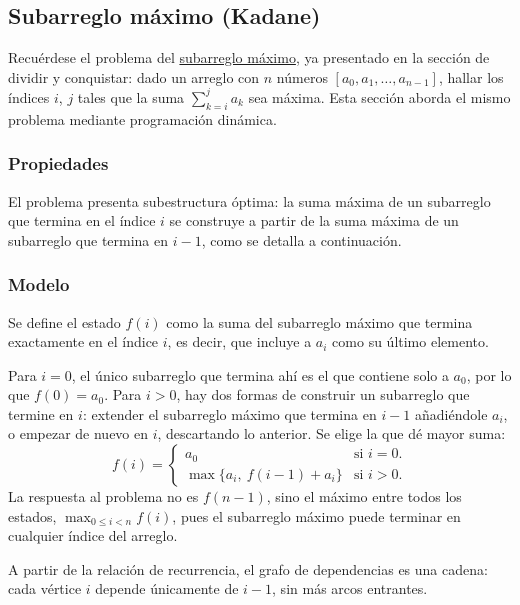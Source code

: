 \subsection{Subarreglo máximo (Kadane)}

Recuérdese el problema del \hyperref[sec:subarreglo_max]{subarreglo máximo}, ya presentado en la sección de dividir y conquistar: dado un arreglo con \(n\) números \([a_0, a_1, \ldots, a_{n-1}]\), hallar los índices \(i\), \(j\) tales que la suma \(\sum_{k=i}^j a_k\) sea máxima. Esta sección aborda el mismo problema mediante programación dinámica.

\subsubsection{Propiedades}

El problema presenta subestructura óptima: la suma máxima de un subarreglo que termina en el índice \(i\) se construye a partir de la suma máxima de un subarreglo que termina en \(i-1\), como se detalla a continuación.

\subsubsection{Modelo}

Se define el estado \(f(i)\) como la suma del subarreglo máximo que termina exactamente en el índice \(i\), es decir, que incluye a \(a_i\) como su último elemento.

Para \(i = 0\), el único subarreglo que termina ahí es el que contiene solo a \(a_0\), por lo que \(f(0) = a_0\). Para \(i > 0\), hay dos formas de construir un subarreglo que termine en \(i\): extender el subarreglo máximo que termina en \(i-1\) añadiéndole \(a_i\), o empezar de nuevo en \(i\), descartando lo anterior. Se elige la que dé mayor suma:
\[
f(i) = \begin{cases}
  a_0 & \text{si } i = 0. \\
  \max\{a_i,\ f(i-1) + a_i\} & \text{si } i > 0.
\end{cases}
\]
La respuesta al problema no es \(f(n-1)\), sino el máximo entre todos los estados, \(\max_{0 \leq i < n} f(i)\), pues el subarreglo máximo puede terminar en cualquier índice del arreglo.

A partir de la relación de recurrencia, el grafo de dependencias es una cadena: cada vértice \(i\) depende únicamente de \(i-1\), sin más arcos entrantes.


